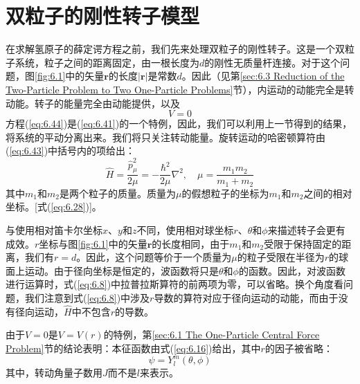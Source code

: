 \section{双粒子的刚性转子模型}
\label{sec:6.4 The Two-Particle Rigid Rotor}
    在求解氢原子的薛定谔方程之前，我们先来处理双粒子的刚性转子。这是一个双粒子系统，粒子之间的距离固定，由一根长度为$d$的刚性无质量杆连接。对于这个问题，图\ref{fig:6.1}中的矢量$\mathbf{r}$的长度$\left|\mathbf{r}\right|$是常数$d$。因此（见第\ref{sec:6.3 Reduction of the Two-Particle Problem to Two One-Particle Problems}节），内运动的动能完全是转动能。转子的能量完全由动能提供，以及
    \begin{equation}
        V=0
        \label{eq:6.44}
    \end{equation}
    方程(\ref{eq:6.44})是(\ref{eq:6.41})的一个特例，因此，我们可以利用上一节得到的结果，将系统的平动分离出来。我们将只关注转动能量。旋转运动的哈密顿算符由(\ref{eq:6.43})中括号内的项给出：
    \begin{equation}
        \hat{H} = \frac{\hat{p}_{\mu}^2}{2\mu} = -\frac{\hbar^2}{2\mu}\nabla^2, \quad \mu = \frac{m_1m_2}{m_1+m_2}
        \label{eq:6.45}
    \end{equation}
    其中$m_1$和$m_2$是两个粒子的质量。质量为$\mu$的假想粒子的坐标为$m_1$和$m_2$之间的相对坐标。[式(\ref{eq:6.28})]。

    与使用相对笛卡尔坐标$x$、$y$和$z$不同，使用相对球坐标$r$、$\theta$和$\phi$来描述转子会更有成效。$r$坐标与图\ref{fig:6.1}中的矢量$\mathbf{r}$的长度相同，由于$m_1$和$m_2$受限于保持固定的距离，我们有$r=d$。因此，这个问题等价于一个质量为$\mu$的粒子受限在半径为$r$的球面上运动。由于径向坐标是恒定的，波函数将只是$\theta$和$\phi$的函数。因此，对波函数进行运算时，式(\ref{eq:6.8})中拉普拉斯算符的前两项为零，可以省略。换个角度看问题，我们注意到式(\ref{eq:6.8})中涉及$r$导数的算符对应于径向运动的动能，而由于没有径向运动，$\hat{H}$中不包含$r$的导数。

    由于$V=0$是$V=V\left(r\right)$的特例，第\ref{sec:6.1 The One-Particle Central Force Problem}节的结论表明：本征函数由式(\ref{eq:6.16})给出，其中$r$的因子被省略：
    \begin{equation}
        \psi = Y_l^m\left(\theta, \phi\right)
        \label{eq:6.46}
    \end{equation}
    其中，转动角量子数用$J$而不是$l$来表示。

